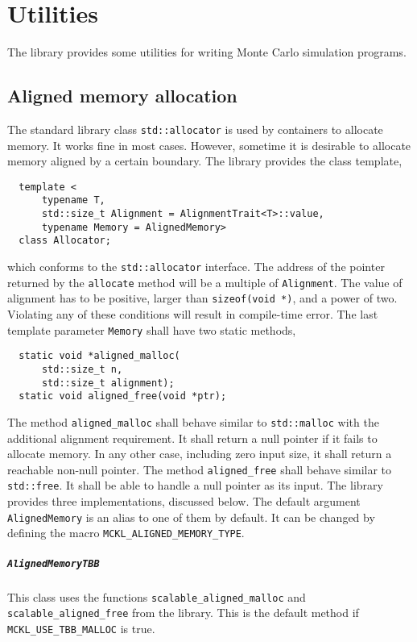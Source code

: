 \chapter{Utilities}
\label{chap:Utilities}

The library provides some utilities for writing Monte Carlo simulation
programs.

\section{Aligned memory allocation}
\label{sec:Aligned memory allocation}

The standard library class \verb|std::allocator| is used by containers to
allocate memory. It works fine in most cases. However, sometime it is desirable
to allocate memory aligned by a certain boundary. The library provides the
class template,
\begin{Verbatim}
  template <
      typename T,
      std::size_t Alignment = AlignmentTrait<T>::value,
      typename Memory = AlignedMemory>
  class Allocator;
\end{Verbatim}
which conforms to the \verb|std::allocator| interface. The address of the
pointer returned by the \verb|allocate| method will be a multiple of
\verb|Alignment|. The value of alignment has to be positive, larger than
\verb|sizeof(void *)|, and a power of two. Violating any of these conditions
will result in compile-time error. The last template parameter \verb|Memory|
shall have two static methods,
\begin{Verbatim}
  static void *aligned_malloc(
      std::size_t n,
      std::size_t alignment);
  static void aligned_free(void *ptr);
\end{Verbatim}
The method \verb|aligned_malloc| shall behave similar to \verb|std::malloc|
with the additional alignment requirement. It shall return a null pointer if it
fails to allocate memory. In any other case, including zero input size, it
shall return a reachable non-null pointer. The method \verb|aligned_free| shall
behave similar to \verb|std::free|. It shall be able to handle a null pointer
as its input. The library provides three implementations, discussed below. The
default argument \verb|AlignedMemory| is an alias to one of them by default. It
can be changed by defining the macro \verb|MCKL_ALIGNED_MEMORY_TYPE|.

\paragraph{\texttt{AlignedMemoryTBB}} This class uses the functions
\verb|scalable_aligned_malloc| and \verb|scalable_aligned_free| from the \tbb
library.
This is the default method if \verb|MCKL_USE_TBB_MALLOC| is true.

